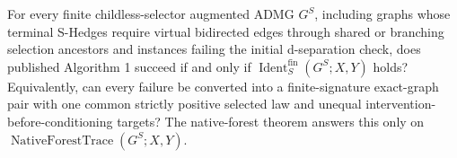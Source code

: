 For every finite childless-selector augmented ADMG \(G^S\), including graphs whose terminal S-Hedges require virtual bidirected edges through shared or branching selection ancestors and instances failing the initial d-separation check, does published Algorithm 1 succeed if and only if \(\operatorname{Ident}^{\mathrm{fin}}_S(G^S;X,Y)\) holds? Equivalently, can every failure be converted into a finite-signature exact-graph pair with one common strictly positive selected law and unequal intervention-before-conditioning targets? The native-forest theorem answers this only on \(\operatorname{NativeForestTrace}(G^S;X,Y)\).